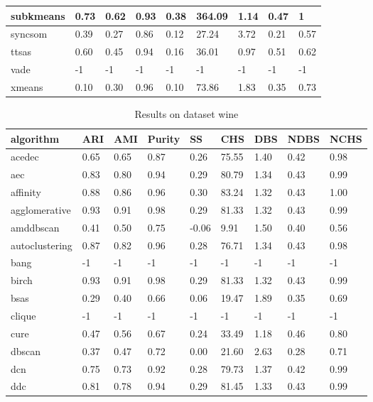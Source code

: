 \begin{table}[H]
\begin{tabular}{|l|l|l|l|l|l|l|l|l|}
\hline
subkmeans & 0.73 & 0.62 & 0.93 & 0.38 & 364.09 & 1.14 & 0.47 & 1 \\
\hline
syncsom & 0.39 & 0.27 & 0.86 & 0.12 & 27.24 & 3.72 & 0.21 & 0.57 \\
\hline
ttsas & 0.60 & 0.45 & 0.94 & 0.16 & 36.01 & 0.97 & 0.51 & 0.62 \\
\hline
vade & -1 & -1 & -1 & -1 & -1 & -1 & -1 & -1 \\
\hline
xmeans & 0.10 & 0.30 & 0.96 & 0.10 & 73.86 & 1.83 & 0.35 & 0.73 \\
\hline
\end{tabular}
\end{table}



\begin{table}[H]
\centering
\caption{Results on dataset wine}
\label{S71_Table}
\begin{tabular}{|l|l|l|l|l|l|l|l|l|}
\hline
algorithm & ARI & AMI & Purity & SS & CHS & DBS & NDBS & NCHS \\
\hline
acedec & 0.65 & 0.65 & 0.87 & 0.26 & 75.55 & 1.40 & 0.42 & 0.98 \\
\hline
aec & 0.83 & 0.80 & 0.94 & 0.29 & 80.79 & 1.34 & 0.43 & 0.99 \\
\hline
affinity & 0.88 & 0.86 & 0.96 & 0.30 & 83.24 & 1.32 & 0.43 & 1.00 \\
\hline
agglomerative & 0.93 & 0.91 & 0.98 & 0.29 & 81.33 & 1.32 & 0.43 & 0.99 \\
\hline
amddbscan & 0.41 & 0.50 & 0.75 & -0.06 & 9.91 & 1.50 & 0.40 & 0.56 \\
\hline
autoclustering & 0.87 & 0.82 & 0.96 & 0.28 & 76.71 & 1.34 & 0.43 & 0.98 \\
\hline
bang & -1 & -1 & -1 & -1 & -1 & -1 & -1 & -1 \\
\hline
birch & 0.93 & 0.91 & 0.98 & 0.29 & 81.33 & 1.32 & 0.43 & 0.99 \\
\hline
bsas & 0.29 & 0.40 & 0.66 & 0.06 & 19.47 & 1.89 & 0.35 & 0.69 \\
\hline
clique & -1 & -1 & -1 & -1 & -1 & -1 & -1 & -1 \\
\hline
cure & 0.47 & 0.56 & 0.67 & 0.24 & 33.49 & 1.18 & 0.46 & 0.80 \\
\hline
dbscan & 0.37 & 0.47 & 0.72 & 0.00 & 21.60 & 2.63 & 0.28 & 0.71 \\
\hline
dcn & 0.75 & 0.73 & 0.92 & 0.28 & 79.73 & 1.37 & 0.42 & 0.99 \\
\hline
ddc & 0.81 & 0.78 & 0.94 & 0.29 & 81.45 & 1.33 & 0.43 & 0.99 \\

\end{tabular}
\end{table}

